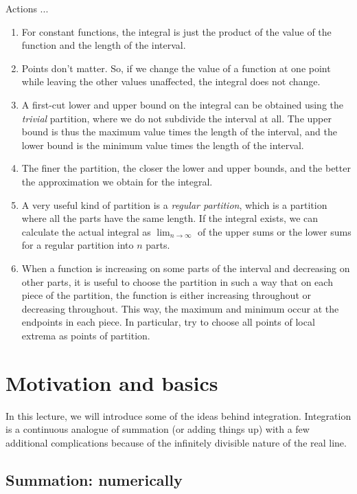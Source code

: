 \documentclass{amsart}
\begin{document}
Actions ...

\begin{enumerate}
\item For constant functions, the integral is just the product of the
  value of the function and the length of the interval.
\item Points don't matter. So, if we change the value of a function at
  one point while leaving the other values unaffected, the integral
  does not change.
\item A first-cut lower and upper bound on the integral can be
  obtained using the {\em trivial} partition, where we do not
  subdivide the interval at all. The upper bound is thus the maximum
  value times the length of the interval, and the lower bound is the
  minimum value times the length of the interval.
\item The finer the partition, the closer the lower and upper bounds,
  and the better the approximation we obtain for the integral.
\item A very useful kind of partition is a {\em regular partition},
  which is a partition where all the parts have the same length. If
  the integral exists, we can calculate the actual integral as
  $\lim_{n \to \infty}$ of the upper sums or the lower sums for a
  regular partition into $n$ parts.
\item When a function is increasing on some parts of the interval and
  decreasing on other parts, it is useful to choose the partition in
  such a way that on each piece of the partition, the function is
  either increasing throughout or decreasing throughout. This way, the
  maximum and minimum occur at the endpoints in each piece. In
  particular, try to choose all points of local extrema as points of
  partition.
\end{enumerate}

\section{Motivation and basics}

In this lecture, we will introduce some of the ideas behind
integration. Integration is a continuous analogue of summation (or
adding things up) with a few additional complications because of the
infinitely divisible nature of the real line.

\subsection{Summation: numerically}
\end{document}
